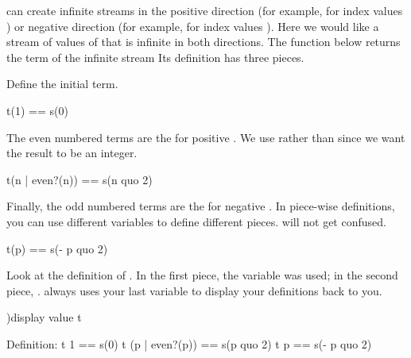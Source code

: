 \Language{} can create infinite streams in the positive direction (for
example, for index values ) or negative direction (for
example, for index values ).
Here we would like a stream of values of  that is infinite in
both directions.
The function  below returns the  term of the infinite
stream 
Its definition has three pieces.
\begin{xtc}
\begin{xtccomment}
Define the initial term.
\end{xtccomment}
\begin{spadsrc}
t(1) == s(0)
\end{spadsrc}
\end{xtc}
\begin{xtc}
\begin{xtccomment}
The even numbered terms are the  for positive .
We use  rather than \spadop{/}
since we want the result to be an integer.
\end{xtccomment}
\begin{spadsrc}
t(n | even?(n)) == s(n quo 2)
\end{spadsrc}
\end{xtc}
\begin{xtc}
\begin{xtccomment}
Finally, the odd numbered terms are the
 for negative .
In piece-wise definitions, you can use different variables
to define different pieces. \Language{} will not get confused.
\end{xtccomment}
\begin{spadsrc}
t(p) == s(- p quo 2)
\end{spadsrc}
\end{xtc}
\begin{xtc}
\begin{xtccomment}
Look at the definition of .
In the first piece, the variable 
was used; in the second piece, .
\Language{} always uses
your last variable to display your definitions
back to you.
\end{xtccomment}
\begin{spadsrc}
)display value t
\end{spadsrc}
\begin{SysCmdOutput}
   Definition:
     t 1 == s(0)
     t (p | even?(p)) == s(p quo 2)
     t p == s(- p quo 2)
\end{SysCmdOutput}
\end{xtc}
